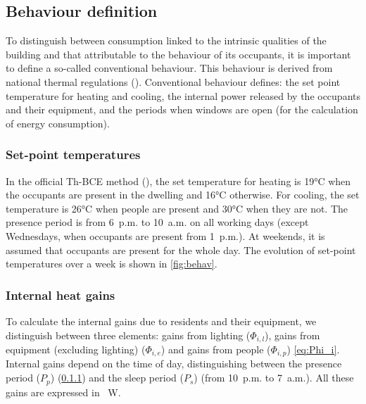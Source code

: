 \documentclass[11pt]{article}
\begin{document}
        
    

    \subsection{Behaviour definition} %
    \label{sub:behaviour_definition}


    To distinguish between consumption linked to the intrinsic qualities of the building and that attributable to the behaviour of its occupants, it is important to define a so-called conventional behaviour. This behaviour is derived from national thermal regulations (\cite{ministere_de_la_transition_ecologique_methode_2021-1}). Conventional behaviour defines: the set point temperature for heating and cooling, the internal power released by the occupants and their equipment, and the periods when windows are open (for the calculation of energy consumption).

    \subsubsection{Set-point temperatures} %
    \label{ssub:set_point_temperature}
    
    In the official Th-BCE method (\cite{ministere_de_la_transition_ecologique_methode_2021-1}), the set temperature for heating is 19°C when the occupants are present in the dwelling and 16°C otherwise. For cooling, the set temperature is 26°C when people are present and 30°C when they are not. The presence period is from 6~p.m. to 10~a.m. on all working days (except Wednesdays, when occupants are present from 1~p.m.). At weekends, it is assumed that occupants are present for the whole day. The evolution of set-point temperatures over a week is shown in \ref{fig:behav}.


    \subsubsection{Internal heat gains} %
    \label{ssub:internal_heat_gains}
    
    To calculate the internal gains due to residents and their equipment, we distinguish between three elements: gains from lighting ($\Phi_{i,l}$), gains from equipment (excluding lighting) ($\Phi_{i,e}$) and gains from people ($\Phi_{i,p}$) \eqref{eq:Phi_i}. Internal gains depend on the time of day, distinguishing between the presence period ($P_p$) (\ref{ssub:set_point_temperature}) and the sleep period ($P_s$) (from 10~p.m. to 7~a.m.). All these gains are expressed in \SI{}{\watt}.
\end{document}
